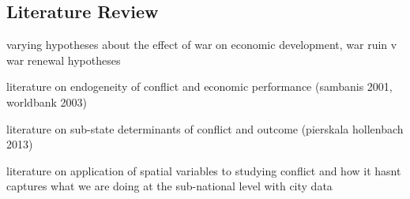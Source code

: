 \subsection{Literature Review}
\label{lit}

varying hypotheses about the effect of war on economic development, war ruin v war renewal hypotheses
	
literature on endogeneity of conflict and economic performance (sambanis 2001, worldbank 2003)

literature on sub-state determinants of conflict and outcome (pierskala hollenbach 2013)

literature on application of spatial variables to studying conflict and how it hasnt captures what we are doing at the sub-national level with city data